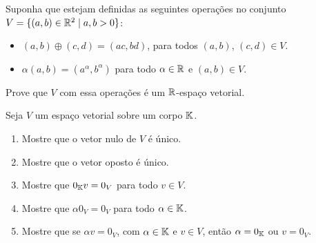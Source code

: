 \documentclass[12pt]{exam}
\begin{document}

\begin{exercicio}
  Suponha que estejam definidas as seguintes opera\c{c}\~oes no conjunto $V = \{(a, b) \in \mathbb{R}^2 \mid a, b > 0\}$:
  \begin{itemize}
    \item $(a, b) \oplus (c, d) = (ac, bd)$, para todos $(a,b)$, $(c,d) \in V$.
    \item $\alpha (a, b) = (a^\alpha, b^\alpha)$ para todo $\alpha \in \mathbb{R}$ e $(a, b) \in V$.
  \end{itemize}
  Prove que $V$ com essa opera\c{c}\~oes \'e um $\mathbb{R}$-espa\c{c}o vetorial.
\end{exercicio}

\begin{exercicio}
  Seja $V$ um espa\c{c}o vetorial sobre um corpo $\mathbb{K}$.
  \begin{enumerate}[label={\alph*})]
    \item Mostre que o vetor nulo de $V$ \'e \'unico.
    \item Mostre que o vetor oposto \'e \'unico.
    \item Mostre que $0_{\mathbb{K}} v = 0_V$ para todo $v \in V$.
    \item Mostre que $\alpha 0_V = 0_V$ para todo $\alpha \in \mathbb{K}$.
    \item Mostre que se $\alpha v = 0_V$, com $\alpha \in \mathbb{K}$ e $v \in V$, ent\~ao $\alpha = 0_{\mathbb{K}}$ ou $v = 0_V$.
  \end{enumerate}
\end{exercicio}

%
\end{document}
